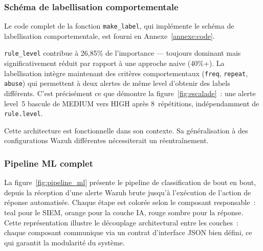 \documentclass[12pt,a4paper]{report}
\begin{document}
\subsubsection{Schéma de labellisation comportementale}
\label{sec:labellisation}

Le code complet de la fonction \texttt{make\_label}, qui implémente
le schéma de labellisation comportementale, est fourni en
Annexe~\ref{annexe:code}.

\begin{tcolorbox}[colback=ColWarning!8, colframe=ColWarning, arc=4pt,
  boxrule=0.8pt,
  title={\textbf{Point méthodologique — corrélation feature-label}}]

\texttt{rule\_level} contribue à 26,85\% de l'importance — toujours dominant mais significativement réduit par rapport à une approche naive (40\%+). La labellisation intègre maintenant des critères comportementaux (\texttt{freq}, \texttt{repeat}, \texttt{abuse}) qui permettent à deux alertes de même level d'obtenir des labels différents. C'est précisément ce que démontre la figure~\ref{fig:escalade}~: une alerte level~5 bascule de MEDIUM vers HIGH après 8~répétitions, indépendamment de \texttt{rule.level}.

Cette architecture est fonctionnelle dans son contexte. Sa généralisation à des configurations Wazuh différentes nécessiterait un réentraînement.
\end{tcolorbox}

\needspace{10cm}
\subsubsection{Pipeline ML complet}

La figure~\ref{fig:pipeline_ml} présente le pipeline de classification de bout en bout, depuis la réception d'une alerte Wazuh brute jusqu'à l'exécution de l'action de réponse automatisée. Chaque étape est colorée selon le composant responsable~: teal pour le SIEM, orange pour la couche IA, rouge sombre pour la réponse. Cette représentation illustre le découplage architectural entre les couches~: chaque composant communique via un contrat d'interface JSON bien défini, ce qui garantit la modularité du système.
\end{document}
